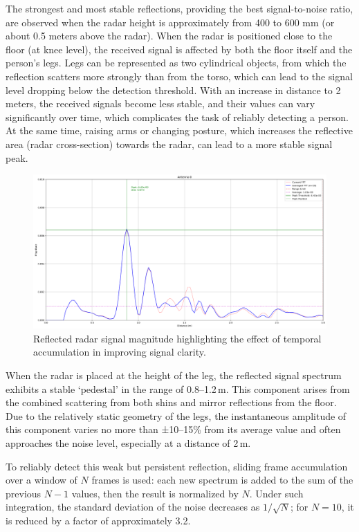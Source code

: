 The strongest and most stable reflections, providing the best signal-to-noise ratio, are observed when the radar height is approximately from 400 to 600 mm (or about 0.5 meters above the radar). When the radar is positioned close to the floor (at knee level), the received signal is affected by both the floor itself and the person's legs. Legs can be represented as two cylindrical objects, from which the reflection scatters more strongly than from the torso, which can lead to the signal level dropping below the detection threshold. With an increase in distance to 2 meters, the received signals become less stable, and their values can vary significantly over time, which complicates the task of reliably detecting a person. At the same time, raising arms or changing posture, which increases the reflective area (radar cross-section) towards the radar, can lead to a more stable signal peak.


\begin{figure}
    \centering
    \includegraphics[width=0.75\linewidth]{Src/images/radar_plot.png}
    \caption{Reflected radar signal magnitude highlighting the effect of temporal accumulation in improving signal clarity.}

    \label{fig:signal-clarity}
\end{figure}


When the radar is placed at the height of the leg, the reflected signal spectrum exhibits a stable `pedestal' in the range of 0.8–1.2\,m. This component arises from the combined scattering from both shins and mirror reflections from the floor. Due to the relatively static geometry of the legs, the instantaneous amplitude of this component varies no more than ±10–15\% from its average value and often approaches the noise level, especially at a distance of 2\,m.

To reliably detect this weak but persistent reflection, sliding frame accumulation over a window of \(N\) frames is used: each new spectrum is added to the sum of the previous \(N-1\) values, then the result is normalized by \(N\). Under such integration, the standard deviation of the noise decreases as \(1/\sqrt{N}\); for \(N = 10\), it is reduced by a factor of approximately 3.2.

